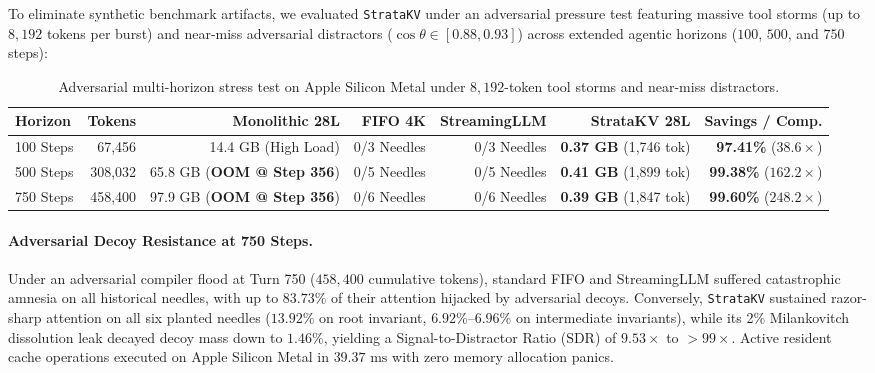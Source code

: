 To eliminate synthetic benchmark artifacts, we evaluated \texttt{StrataKV} under an adversarial pressure test featuring massive tool storms (up to $8,192$ tokens per burst) and near-miss adversarial distractors ($\cos \theta \in [0.88, 0.93]$) across extended agentic horizons ($100$, $500$, and $750$ steps):

\begin{table}[h]
\centering
\small
\begin{tabular}{@{}lrrrrrr@{}}
\toprule
\textbf{Horizon} & \textbf{Tokens} & \textbf{Monolithic 28L} & \textbf{FIFO 4K} & \textbf{StreamingLLM} & \textbf{StrataKV 28L} & \textbf{Savings / Comp.} \\ \midrule
100 Steps & 67,456 & 14.4 GB (High Load) & 0/3 Needles & 0/3 Needles & \textbf{0.37 GB} (1,746 tok) & \textbf{97.41\%} ($38.6\times$) \\
500 Steps & 308,032 & 65.8 GB (\textbf{OOM @ Step 356}) & 0/5 Needles & 0/5 Needles & \textbf{0.41 GB} (1,899 tok) & \textbf{99.38\%} ($162.2\times$) \\
750 Steps & 458,400 & 97.9 GB (\textbf{OOM @ Step 356}) & 0/6 Needles & 0/6 Needles & \textbf{0.39 GB} (1,847 tok) & \textbf{99.60\%} ($248.2\times$) \\ \bottomrule
\end{tabular}
\caption{Adversarial multi-horizon stress test on Apple Silicon Metal under $8,192$-token tool storms and near-miss distractors.}
\label{tab:adversarial_stress}
\end{table}

\paragraph{Adversarial Decoy Resistance at 750 Steps.}
Under an adversarial compiler flood at Turn 750 ($458,400$ cumulative tokens), standard FIFO and StreamingLLM suffered catastrophic amnesia on all historical needles, with up to $83.73\%$ of their attention hijacked by adversarial decoys. Conversely, \texttt{StrataKV} sustained razor-sharp attention on all six planted needles ($13.92\%$ on root invariant, $6.92\%$--$6.96\%$ on intermediate invariants), while its 2\% Milankovitch dissolution leak decayed decoy mass down to $1.46\%$, yielding a Signal-to-Distractor Ratio ($\text{SDR}$) of $9.53\times$ to $>99\times$. Active resident cache operations executed on Apple Silicon Metal in $39.37\text{ ms}$ with zero memory allocation panics.


